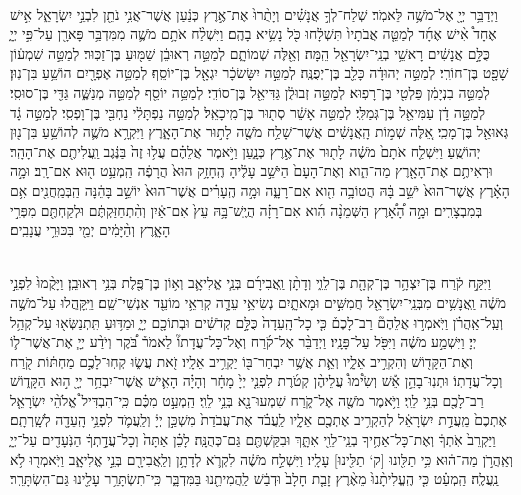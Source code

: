 \documentclass[twoside, openany, parskip=half, 11pt]{book}
\begin{document}
\begin{footnotesize}
\begin{multicols}{2}
\\
  וַיְדַבֵּ֥ר יְיָ֖ אֶל־מֹשֶׁ֥ה לֵּאמֹֽר׃ שְׁלַח־לְךָ֣ אֲנָשִׁ֗ים וְיָתֻ֨רוּ֙ אֶת־אֶ֣רֶץ כְּנַ֔עַן אֲשֶׁר־אֲנִ֥י נֹתֵ֖ן לִבְנֵ֣י יִשְׂרָאֵ֑ל אִ֣ישׁ אֶחָד֩ אִ֨ישׁ אֶחָ֜ד לְמַטֵּ֤ה אֲבֹתָיו֙ תִּשְׁלָ֔חוּ כֹּ֖ל נָשִׂ֥יא בָהֶֽם׃ וַיִּשְׁלַ֨ח אֹתָ֥ם מֹשֶׁ֛ה מִמִּדְבַּ֥ר פָּארָ֖ן עַל־פִּ֣י יְיָ֑ כֻּלָּ֣ם אֲנָשִׁ֔ים רָאשֵׁ֥י בְנֵֽי־יִשְׂרָאֵ֖ל הֵֽמָּה׃  וְאֵ֖לֶּה שְׁמוֹתָ֑ם לְמַטֵּ֣ה רְאוּבֵ֔ן שַׁמּ֖וּעַ בֶּן־זַכּֽוּר׃ לְמַטֵּ֣ה שִׁמְע֔וֹן שָׁפָ֖ט בֶּן־חוֹרִֽי׃ לְמַטֵּ֣ה יְהוּדָ֔ה כָּלֵ֖ב בֶּן־יְפֻנֶּֽה׃ לְמַטֵּ֣ה יִשָּׂשׂכָ֔ר יִגְאָ֖ל בֶּן־יוֹסֵֽף׃ לְמַטֵּ֥ה אֶפְרָ֖יִם הוֹשֵׁ֥עַ בִּן־נֽוּן׃ לְמַטֵּ֣ה בִנְיָמִ֔ן פַּלְטִ֖י בֶּן־רָפֽוּא׃ לְמַטֵּ֣ה זְבוּלֻ֔ן גַּדִּיאֵ֖ל בֶּן־סוֹדִֽי׃ לְמַטֵּ֥ה יוֹסֵ֖ף לְמַטֵּ֣ה מְנַשֶּׁ֑ה גַּדִּ֖י בֶּן־סוּסִֽי׃ לְמַטֵּ֣ה דָ֔ן עַמִּיאֵ֖ל בֶּן־גְּמַלִּֽי׃ לְמַטֵּ֣ה אָשֵׁ֔ר סְת֖וּר בֶּן־מִֽיכָאֵֽל׃ לְמַטֵּ֣ה נַפְתָּלִ֔י נַחְבִּ֖י בֶּן־וָפְסִֽי׃ לְמַטֵּ֣ה גָ֔ד גְּאוּאֵ֖ל בֶּן־מָכִֽי׃ אֵ֚לֶּה שְׁמ֣וֹת הָֽאֲנָשִׁ֔ים אֲשֶׁר־שָׁלַ֥ח מֹשֶׁ֖ה לָת֣וּר אֶת־הָאָ֑רֶץ וַיִּקְרָ֥א מֹשֶׁ֛ה לְהוֹשֵׁ֥עַ בִּן־נ֖וּן יְהוֹשֻֽׁעַ׃  וַיִּשְׁלַ֤ח אֹתָם֙ מֹשֶׁ֔ה לָת֖וּר אֶת־אֶ֣רֶץ כְּנָ֑עַן וַיֹּ֣אמֶר אֲלֵהֶ֗ם עֲל֥וּ זֶה֙ בַּנֶּ֔גֶב וַֽעֲלִיתֶ֖ם אֶת־הָהָֽר׃ וּרְאִיתֶ֥ם אֶת־הָאָ֖רֶץ מַה־הִ֑וא וְאֶת־הָעָם֙ הַיֹּשֵׁ֣ב עָלֶ֔יהָ הֶֽחָזָ֥ק הוּא֙ הֲרָפֶ֔ה הַֽמְעַ֥ט ה֖וּא אִם־רָֽב׃ וּמָ֣ה הָאָ֗רֶץ אֲשֶׁר־הוּא֙ יֹשֵׁ֣ב בָּ֔הּ הֲטוֹבָ֥ה הִ֖וא אִם־רָעָ֑ה וּמָ֣ה הֶֽעָרִ֗ים אֲשֶׁר־הוּא֙ יוֹשֵׁ֣ב בָּהֵ֔נָּה הַֽבְּמַֽחֲנִ֖ים אִ֥ם בְּמִבְצָרִֽים׃ וּמָ֣ה הָ֠אָ֠רֶץ הַשְּׁמֵנָ֨ה הִ֜וא אִם־רָזָ֗ה הֲיֶֽשׁ־בָּ֥הּ עֵץ֙ אִם־אַ֔יִן וְהִ֨תְחַזַּקְתֶּ֔ם וּלְקַחְתֶּ֖ם מִפְּרִ֣י הָאָ֑רֶץ וְהַ֨יָּמִ֔ים יְמֵ֖י בִּכּוּרֵ֥י עֲנָבִֽים׃

\\
 וַיִּקַּ֣ח קֹ֔רַח בֶּן־יִצְהָ֥ר בֶּן־קְהָ֖ת בֶּן־לֵוִ֑י וְדָתָ֨ן וַֽאֲבִירָ֜ם בְּנֵ֧י אֱלִיאָ֛ב וְא֥וֹן בֶּן־פֶּ֖לֶת בְּנֵ֥י רְאוּבֵֽן׃ וַיָּקֻ֨מוּ֙ לִפְנֵ֣י מֹשֶׁ֔ה וַֽאֲנָשִׁ֥ים מִבְּנֵֽי־יִשְׂרָאֵ֖ל חֲמִשִּׁ֣ים וּמָאתָ֑יִם נְשִׂיאֵ֥י עֵדָ֛ה קְרִאֵ֥י מוֹעֵ֖ד אַנְשֵׁי־שֵֽׁם׃ וַיִּֽקָּֽהֲלוּ עַל־מֹשֶׁ֣ה וְעַֽל־אַֽהֲרֹ֗ן וַיֹּֽאמְר֣וּ אֲלֵהֶם֘ רַב־לָכֶם֒ כִּ֤י כָל־הָֽעֵדָה֙ כֻּלָּ֣ם קְדֹשִׁ֔ים וּבְתוֹכָ֖ם יְיָ֑ וּמַדּ֥וּעַ תִּֽתְנַשְּׂא֖וּ עַל־קְהַ֥ל יְיָ׃  וַיִּשְׁמַ֣ע מֹשֶׁ֔ה וַיִּפֹּ֖ל עַל־פָּנָֽיו׃ וַיְדַבֵּ֨ר אֶל־קֹ֜רַח וְאֶל־כָּל־עֲדָתוֹ֘ לֵאמֹר֒ בֹּ֠קֶר וְיֹדַ֨ע יְיָ֧ אֶת־אֲשֶׁר־ל֛וֹ וְאֶת־הַקָּד֖וֹשׁ וְהִקְרִ֣יב אֵלָ֑יו וְאֵ֛ת אֲשֶׁ֥ר יִבְחַר־בּ֖וֹ יַקְרִ֥יב אֵלָֽיו׃ זֹ֖את עֲשׂ֑וּ קְחֽוּ־לָכֶ֣ם מַחְתּ֔וֹת קֹ֖רַח וְכָל־עֲדָתֽוֹ׃ וּתְנֽוּ־בָהֵ֣ן אֵ֡שׁ וְשִׂ֩ימוּ֩ עֲלֵיהֶ֨ן קְטֹ֜רֶת לִפְנֵ֤י יְיָ֙ מָחָ֔ר וְהָיָ֗ה הָאִ֛ישׁ אֲשֶׁר־יִבְחַ֥ר יְיָ֖ ה֣וּא הַקָּד֑וֹשׁ רַב־לָכֶ֖ם בְּנֵ֥י לֵוִֽי׃  וַיֹּ֥אמֶר מֹשֶׁ֖ה אֶל־קֹ֑רַח שִׁמְעוּ־נָ֖א בְּנֵ֥י לֵוִֽי׃ הַֽמְעַ֣ט מִכֶּ֗ם כִּֽי־הִבְדִּיל֩ אֱלֹהֵ֨י יִשְׂרָאֵ֤ל אֶתְכֶם֙ מֵֽעֲדַ֣ת יִשְׂרָאֵ֔ל לְהַקְרִ֥יב אֶתְכֶ֖ם אֵלָ֑יו לַֽעֲבֹ֗ד אֶת־עֲבֹדַת֙ מִשְׁכַּ֣ן יְיָ֔ וְלַֽעֲמֹ֛ד לִפְנֵ֥י הָֽעֵדָ֖ה לְשָֽׁרְתָֽם׃ וַיַּקְרֵב֙ אֹֽתְךָ֔ וְאֶת־כָּל־אַחֶ֥יךָ בְנֵֽי־לֵוִ֖י אִתָּ֑ךְ וּבִקַּשְׁתֶּ֖ם גַּם־כְּהֻנָּֽה׃ לָכֵ֗ן אַתָּה֙ וְכָל־עֲדָ֣תְךָ֔ הַנֹּֽעָדִ֖ים עַל־יְיָ֑ וְאַֽהֲרֹ֣ן מַה־ה֔וּא כִּ֥י תַלִּ֖ונוּ [ק‘ תַלִּ֖ינוּ] עָלָֽיו׃ וַיִּשְׁלַ֣ח מֹשֶׁ֔ה לִקְרֹ֛א לְדָתָ֥ן וְלַֽאֲבִירָ֖ם בְּנֵ֣י אֱלִיאָ֑ב וַיֹּֽאמְר֖וּ לֹ֥א נַֽעֲלֶֽה׃ הַֽמְעַ֗ט כִּ֤י הֶֽעֱלִיתָ֨נוּ֙ מֵאֶ֨רֶץ זָבַ֤ת חָלָב֙ וּדְבַ֔שׁ לַֽהֲמִיתֵ֖נוּ בַּמִּדְבָּ֑ר כִּֽי־תִשְׂתָּרֵ֥ר עָלֵ֖ינוּ גַּם־הִשְׂתָּרֵֽר׃


\end{multicols}
\end{footnotesize}
\end{document}
